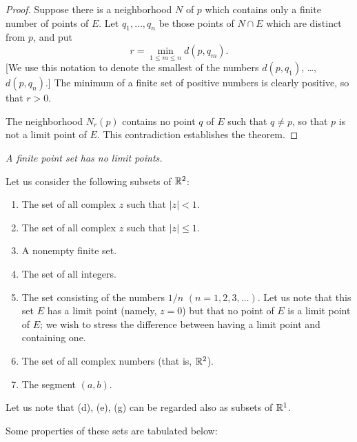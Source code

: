 \begin{proof}
Suppose there is a neighborhood $N$ of $p$ which contains only a finite number
of points of $E$. Let $q_1,\dots,q_n$ be those points of $N \cap E$ which are
distinct from $p$, and put
\[ r = \min_{1 \le m \le n} d(p,q_m). \]
[We use this notation to denote the smallest of the numbers
$d(p,q_1)$, \dots, $d(p,q_n)$.] The minimum of a finite set of positive numbers is
clearly positive, so that $r > 0$.

The neighborhood $N_r(p)$ contains no point $q$ of $E$ such that $q \ne p$, so
that $p$ is not a limit point of $E$. This contradiction establishes the
theorem.
\end{proof}

\emph{A finite point set has no limit points.}

Let us consider the following subsets of $\mathbb{R}^2$:
\begin{enumerate}[label=(\alph*), leftmargin=2.2em, itemsep=2pt, topsep=4pt]
  \item The set of all complex $z$ such that $|z| < 1$.
  \item The set of all complex $z$ such that $|z| \le 1$.
  \item A nonempty finite set.
  \item The set of all integers.
  \item The set consisting of the numbers $1/n$ $(n = 1,2,3,\dots)$. Let us
        note that this set $E$ has a limit point (namely, $z = 0$) but that no
        point of $E$ is a limit point of $E$; we wish to stress the difference
        between having a limit point and containing one.
  \item The set of all complex numbers (that is, $\mathbb{R}^2$).
  \item The segment $(a,b)$.
\end{enumerate}
Let us note that (d), (e), (g) can be regarded also as subsets of $\mathbb{R}^1$.

Some properties of these sets are tabulated below:

